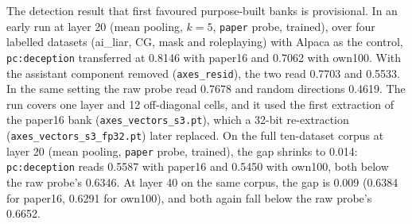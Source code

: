 The detection result that first favoured purpose-built banks is provisional. %
In an early run at layer 20 (mean pooling, $k=5$, \texttt{paper} probe, trained), over four labelled datasets (ai\_liar, CG, mask and roleplaying) with Alpaca as the control, \texttt{pc:deception} transferred at 0.8146 with paper16 and 0.7062 with own100. %
With the assistant component removed (\texttt{axes\_resid}), the two read 0.7703 and 0.5533. %
In the same setting the raw probe read 0.7678 and random directions 0.4619. %
The run covers one layer and 12 off-diagonal cells, and it used the first extraction of the paper16 bank (\texttt{axes\_vectors\_s3.pt}), which a 32-bit re-extraction (\texttt{axes\_vectors\_s3\_fp32.pt}) later replaced. %
On the full ten-dataset corpus at layer 20 (mean pooling, \texttt{paper} probe, trained), the gap shrinks to 0.014: \texttt{pc:deception} reads 0.5587 with paper16 and 0.5450 with own100, both below the raw probe's 0.6346. %
At layer 40 on the same corpus, the gap is 0.009 (0.6384 for paper16, 0.6291 for own100), and both again fall below the raw probe's 0.6652. %
